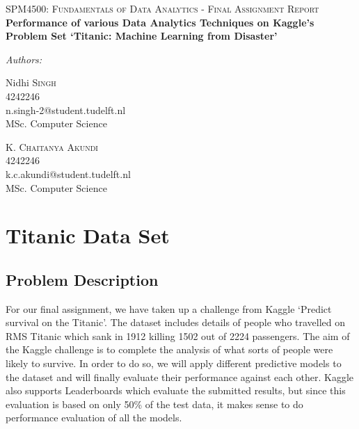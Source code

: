 \documentclass[a4paper,10pt]{report}
\date{\today}
\begin{document}



\begin{titlepage}
\begin{center}

\textsc{\Large SPM4500: Fundamentals of Data Analytics - Final Assignment Report }\\[6cm]

{ \bfseries \Large Performance of various Data Analytics Techniques on Kaggle's Problem Set `Titanic: Machine Learning from Disaster' \\[6cm] }

\begin{minipage}{0.6\textwidth}
\emph{Authors:}\\
\begin{flushleft} \large
Nidhi \textsc{Singh}\\
4242246 \\
n.singh-2@student.tudelft.nl\\
MSc. Computer Science\\
\end{flushleft}

\begin{flushright} \large
K. \textsc{Chaitanya Akundi}\\
4242246 \\
k.c.akundi@student.tudelft.nl\\
MSc. Computer Science\\
\end{flushright}

\end{minipage}

\end{center}
\end{titlepage}

\listoffigures

\chapter*{Titanic Data Set}
\section*{Problem Description}
For our final assignment, we have taken up a challenge from Kaggle `Predict survival on the Titanic'. The dataset includes details of people who travelled on RMS Titanic which sank in 1912 killing 1502 out of 2224 passengers.
The aim of the Kaggle challenge is to complete the analysis of what sorts of people were likely to survive. In order to do so, we will apply different predictive models to the dataset and will finally evaluate their performance against each other. Kaggle also supports Leaderboards which evaluate the submitted results, but since this evaluation is based on only 50\% of the test data, it makes sense to do performance evaluation of all the models.
\end{document}
